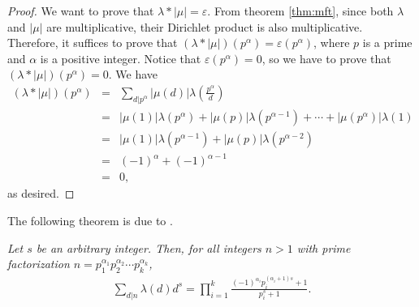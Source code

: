 \documentclass[12pt]{subfile}
\begin{document}
		\begin{proof}
			We want to prove that $\lambda\ast |\mu| = \varepsilon$. From theorem \ref{thm:mft}, since both $\lambda$ and $|\mu|$ are multiplicative, their Dirichlet product is also multiplicative. Therefore, it suffices to prove that $(\lambda\ast |\mu|)(p^\alpha)=\varepsilon(p^\alpha )$, where $p$ is a prime and $\alpha$ is a positive integer. Notice that $\varepsilon(p^\alpha ) = 0$, so we have to prove that $(\lambda\ast |\mu|)(p^\alpha)=0$. We have
				\begin{eqnarray*}
					(\lambda\ast |\mu|)(p^\alpha)
						&=& \sum_{d|p^\alpha} |\mu(d)| \lambda\left(\frac{p^\alpha}{d}\right)\\
						&=& |\mu(1)|\lambda(p^{\alpha}) + |\mu(p)|\lambda(p^{\alpha -1}) + \cdots + |\mu(p^{\alpha})| \lambda(1)\\
						&=& |\mu(1)|\lambda(p^{\alpha-1}) + |\mu(p)|\lambda(p^{\alpha -2})\\
						&=& (-1)^{\alpha} + (-1)^{\alpha -1}\\
						&=& 0,
				\end{eqnarray*}
			as desired.
		\end{proof}
	The following theorem is due to \textcite[Chapter $\S$IV, Section $11$, Page $196-197$]{sierpinski_schinzel_1988}.

		\begin{theorem}\slshape\label{thm:liouville-sum-general}
			Let $s$ be an arbitrary integer. Then, for all integers $n >1$ with prime factorization $n= p_1^{\alpha_1} p_2^{\alpha_2} \cdots p_k^{\alpha_k}$,
				\begin{align*}
					\sum_{d|n} \lambda(d) d^s = \prod_{i=1}^{k} \frac{(-1)^{\alpha_i} p_i^{(\alpha_i+1)s} + 1}{p_i^s + 1}.
				\end{align*}
		\end{theorem}
\end{document}
